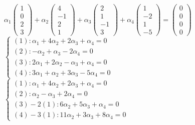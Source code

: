 \documentclass[a4paper, 14pt]{extarticle}
\begin{document}
	$\alpha_1 \begin{pmatrix} 1\\ 0\\ 2\\ 3 \end{pmatrix} + \alpha_2 \begin{pmatrix} 4\\ -1\\ 2\\ 1 \end{pmatrix} + \alpha_3 \begin{pmatrix} 2\\ 1\\ -1\\ 3 \end{pmatrix} + \alpha_4 \begin{pmatrix} 1\\ -2\\ 1\\ -5 \end{pmatrix} = \begin{pmatrix} 0\\ 0\\ 0\\ 0 \end{pmatrix}$\\
	$\begin{cases}
	(1): \alpha_1 + 4\alpha_2 + 2\alpha_3 + \alpha_4 = 0\\
	(2): -\alpha_2 + \alpha_3 - 2\alpha_4 = 0\\
	(3): 2\alpha_1 + 2\alpha_2 - \alpha_3 + \alpha_4 = 0\\
	(4): 3\alpha_1 + \alpha_2 + 3\alpha_3 - 5\alpha_4 = 0
	\end{cases}$\\

	$\begin{cases}
	(1): \alpha_1 + 4\alpha_2 + 2\alpha_3 + \alpha_4 = 0\\
	(2): \alpha_2 - \alpha_3 + 2\alpha_4 = 0\\
	(3)-2(1): 6\alpha_2 + 5\alpha_3 + \alpha_4 = 0\\
	(4)-3(1): 11\alpha_2 + 3\alpha_3 + 8\alpha_4 = 0
	\end{cases}$\\
	
\end{document}
